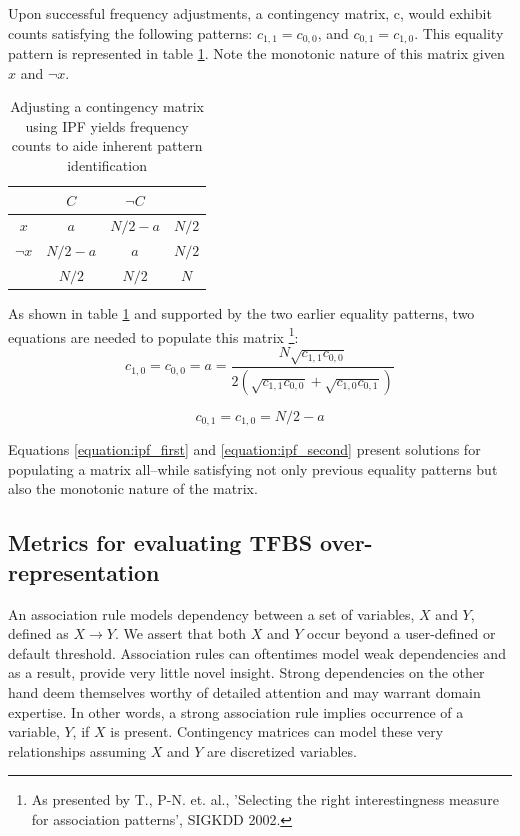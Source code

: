 \documentclass{article}
\begin{document}
Upon successful frequency adjustments, a contingency matrix, c, would
exhibit counts satisfying the following patterns: $c_{1,1} = c_{0,0}$, and
$c_{0,1} = c_{1,0}$. This equality pattern is represented in table
\ref{table:ipf_matrix_rev_counts}. Note the monotonic nature of this matrix
given $x$ and $\neg{x}$. 

\begin{table}[htbc]
	\centering
	\begin{tabular}{c | c | c | c}
	  & $C$    & $\neg{C}$ & \\ \hline
	$x$ & $a$ & $N/2 - a$ & $N/2$\\
	$\neg{x}$ & $N/2 - a$ & $a$ & $N/2$\\ \hline
	& $N/2$ & $N/2$ & $N$\\
	\end{tabular}
	\caption{Adjusting a contingency matrix using IPF yields frequency
	counts to aide inherent pattern identification}
	\label{table:ipf_matrix_rev_counts}
\end{table}

As shown in table \ref{table:ipf_matrix_rev_counts} and supported by the two earlier
equality patterns, two equations are needed to populate this matrix
\footnote{As presented by T., P-N. et. al., 'Selecting the right
interestingness measure for association patterns', SIGKDD 2002.}:
\begin{equation}
	c_{1,0} = c_{0,0} = a = \frac{N \sqrt{c_{1,1} c_{0,0}}}
	{2 (\sqrt{c_{1,1} c_{0,0}} + \sqrt{c_{1,0} c_{0,1}} )}
	\label{equation:ipf_first}
\end{equation}

\begin{equation}
	c_{0,1} = c_{1,0} = N/2 - a
	\label{equation:ipf_second}
\end{equation}

Equations \ref{equation:ipf_first} and \ref{equation:ipf_second} present
solutions for populating a matrix all--while satisfying not only previous
equality patterns but also the monotonic nature of the matrix.

\subsection{Metrics for evaluating TFBS over-representation}
\label{section:metrics}
An association rule models dependency between a set of variables, $X$ and $Y$,
defined as $X \rightarrow Y$. We assert that both $X$ and $Y$ occur beyond a
user-defined or default threshold.
Association rules can oftentimes model weak dependencies and as a result,
provide very little novel insight.
Strong dependencies on the other hand deem themselves worthy of detailed attention and
may warrant domain expertise. In other words, a strong association rule implies
occurrence of a variable, $Y$, if $X$ is present. Contingency matrices can model
these very relationships assuming $X$ and $Y$ are discretized variables.
\end{document}
